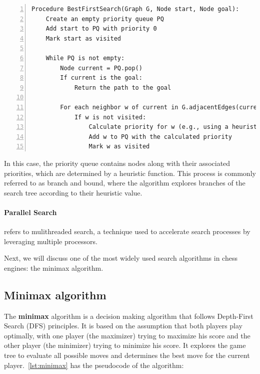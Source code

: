 \vspace{1em}

\begin{lstlisting}[caption={Pseudocode of the Best-First Search algorithm~\cite{Pearl1984}.}, frame=single, numbers=left, xleftmargin=10pt, breaklines=true]
Procedure BestFirstSearch(Graph G, Node start, Node goal):
    Create an empty priority queue PQ
    Add start to PQ with priority 0
    Mark start as visited

    While PQ is not empty:
        Node current = PQ.pop()
        If current is the goal:
            Return the path to the goal

        For each neighbor w of current in G.adjacentEdges(current):
            If w is not visited:
                Calculate priority for w (e.g., using a heuristic)
                Add w to PQ with the calculated priority
                Mark w as visited
\end{lstlisting}

\vspace{1em}

\noindent In this case, the priority queue contains nodes along with their associated priorities, which are determined by a heuristic function. This process is commonly referred to as branch and bound, where the algorithm explores branches of the search tree according to their heuristic value.

\paragraph{Parallel Search} refers to mulithreaded search, a technique used to accelerate search processes by leveraging multiple processors.

\vspace{1em}

\noindent Next, we will discuss one of the most widely used search algorithms in chess engines: the minimax algorithm.

\subsection*{Minimax algorithm}\label{sec:minimax}

The \textbf{minimax} algorithm is a decision making algorithm that follows Depth-First Search (DFS) principles. It is based on the assumption that both players play optimally, with one player (the maximizer) trying to maximize his score and the other player (the minimizer) trying to minimize his score. It explores the game tree to evaluate all possible moves and determines the best move for the current player.~\cref{lst:minimax} has the pseudocode of the algorithm:

